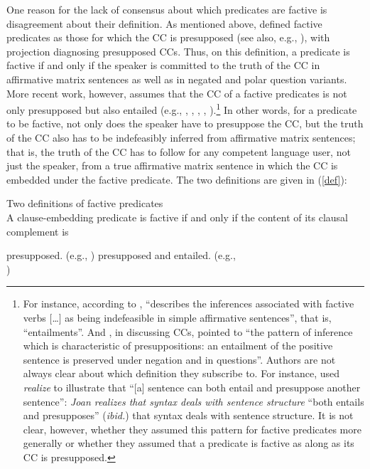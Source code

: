 \documentclass[11pt,fleqn]{article}
\newcommand{\6}{\mbox{$[\hspace*{-.6mm}[$}}
\newcommand{\9}{\mbox{$]\hspace*{-.6mm}]$}}
\begin{document}
One reason for the lack of consensus about which predicates are factive is disagreement about their definition. As mentioned above, \citealt{kiparsky-kiparsky70} defined factive predicates as those for which the CC is presupposed (see also, e.g., \citealt{karttunen71-implicative,karttunen71b}), with projection diagnosing presupposed CCs. Thus, on this definition, a predicate is factive if and only if the speaker is committed to the truth of the CC in affirmative matrix sentences as well as in negated and polar question variants. More recent work, however, assumes that the CC of a factive predicates is not only presupposed but also entailed (e.g., \citealt[119-123]{gazdar79a}, \citealt[139]{schlenker10}, \citealt{abrusan2011}, \citealt[71]{anand-hacquard2014}, \citealt[fn.7]{spector-egre2015}).\footnote{For instance, according to \citet[66f.]{beaver01}, \citet[119-123]{gazdar79a} ``describes the inferences associated with factive verbs $[$\dots$]$ as being indefeasible in simple affirmative sentences'', that is, ``entailments''. And \citet[139]{schlenker10}, in discussing CCs, pointed to ``the pattern of inference which is characteristic of presuppositions: an entailment of the positive sentence is preserved under negation and in questions''. Authors are not always clear about which definition they subscribe to. For instance, \citet[355]{ccmg90} used {\em realize} to illustrate that ``[a] sentence can both entail and presuppose another sentence'': {\em Joan realizes that syntax deals with sentence structure} ``both entails and presupposes''  ({\em ibid.}) that syntax deals with sentence structure. It is not clear, however, whether they assumed this pattern for factive predicates more generally or whether they assumed that a predicate is factive as along as its CC is presupposed.} In other words, for a predicate to be factive, not only does the speaker have to presuppose the CC, but the truth of the CC also has to be indefeasibly inferred from affirmative matrix sentences; that is, the truth of the CC has to follow for any competent language user, not just the speaker, from a true affirmative matrix sentence in which the CC is embedded under the factive predicate. The two definitions are given in (\ref{def}):

\begin{exe}
\ex\label{def} Two definitions of factive predicates \\ A clause-embedding predicate is factive if and only if the content of its clausal complement is 
\begin{xlist}
\ex presupposed. \hfill (e.g., \citealt{kiparsky-kiparsky70,karttunen71-implicative,karttunen71b})
\ex presupposed and entailed.  \hfill (e.g., \citealt{gazdar79a,schlenker10,abrusan2011}\\\hspace*{.2cm}\hfill \citealt{anand-hacquard2014,spector-egre2015})
\end{xlist}
\end{exe}
\end{document}
